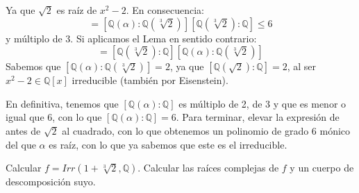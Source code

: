 \begin{ejercicio}
\begin{enumerate}[label=\alph*)]
            Ya que $\sqrt{2}$ es raíz de $x^2-2$. En consecuencia:
            \begin{equation*}
                [\mathbb{Q}(\alpha):\mathbb{Q}] = [\mathbb{Q}(\alpha):\mathbb{Q}(\sqrt[3]{2})][\mathbb{Q}(\sqrt[3]{2}):\mathbb{Q}] \leq 6
            \end{equation*}
            y múltiplo de $3$. Si aplicamos el Lema en sentido contrario:
            \begin{equation*}
                [\mathbb{Q}(\alpha):\mathbb{Q}] = [\mathbb{Q}(\sqrt[3]{2}):\mathbb{Q}][\mathbb{Q}(\alpha):\mathbb{Q}(\sqrt[3]{2})]
            \end{equation*}
            Sabemos que $[\mathbb{Q}(\alpha):\mathbb{Q}(\sqrt[3]{2})]=2$, ya que $[\mathbb{Q}(\sqrt{2}):\mathbb{Q}]=2$, al ser $x^2-2\in \mathbb{Q}[x]$ irreducible (también por Eisenstein).

            En definitiva, tenemos que $[\mathbb{Q}(\alpha):\mathbb{Q}]$ es múltiplo de 2, de 3 y que es menor o igual que 6, con lo que $[\mathbb{Q}(\alpha):\mathbb{Q}] = 6$. Para terminar, elevar la expresión de antes de $\sqrt{2}$ al cuadrado, con lo que obtenemos un polinomio de grado 6 mónico del que $\alpha$ es raíz, con lo que ya sabemos que este es el irreducible.
    \end{enumerate}
\end{ejercicio}

\begin{ejercicio} %
    Calcular $f= Irr(1+\sqrt[3]{2},\mathbb{Q})$. Calcular las raíces complejas de $f$ y un cuerpo de descomposición suyo.
\end{ejercicio}

